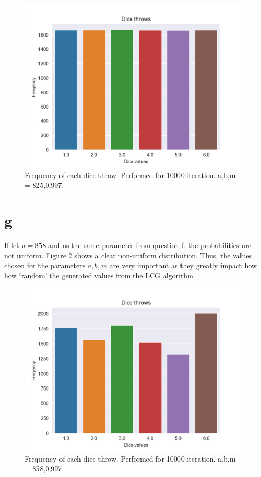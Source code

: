 \documentclass[12pt,a4paper]{article}
\begin{document}
\begin{figure}
\centering
\includegraphics[scale=0.7]{../fig/dice_freqency.png}
\caption{Frequency of each dice throw. Performed for 10000 iteration. a,b,m = 825,0,997.}
\label{fig:dice_throws}
\end{figure}


\section*{g}
If let $a= 858$ and us the same parameter from question f, the probabilities are not uniform. Figure \ref{fig:dice_throws_bad} shows a clear non-uniform distribution. Thus, the values chosen for the parameters $a,b,m$ are very important as they greatly impact how how ‘random’ the generated values from the LCG algorithm.

\begin{figure}
\centering
\includegraphics[scale=0.7]{../fig/dice_freqency_bad.png}
\caption{Frequency of each dice throw. Performed for 10000 iteration. a,b,m = 858,0,997.}
\label{fig:dice_throws_bad}
\end{figure}
\end{document}
